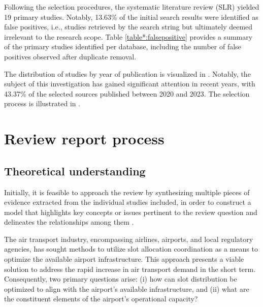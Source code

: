 Following the selection procedures, the systematic literature review (SLR) yielded 19 primary studies. Notably, 13.63\% of the initial search results were identified as false positives, i.e., studies retrieved by the search string but ultimately deemed irrelevant to the research scope. Table \ref{table*:falsepositive} provides a summary of the primary studies identified per database, including the number of false positives observed after duplicate removal.



The distribution of studies by year of publication is visualized in . Notably, the subject of this investigation has gained significant attention in recent years, with 43.37\% of the selected sources published between 2020 and 2023. The selection process is illustrated in .

%

%


\section{Review report process}

\subsection{Theoretical understanding}
Initially, it is feasible to approach the review by synthesizing multiple pieces of evidence extracted from the individual studies included, in order to construct a model that highlights key concepts or issues pertinent to the review question and delineates the relationships among them \cite{popay2006guidance}.

The air transport industry, encompassing airlines, airports, and local regulatory agencies, has sought methods to utilize slot allocation coordination as a means to optimize the available airport infrastructure. This approach presents a viable solution to address the rapid increase in air transport demand in the short term. Consequently, two primary questions arise: (i) how can slot distribution be optimized to align with the airport's available infrastructure, and (ii) what are the constituent elements of the airport's operational capacity?

